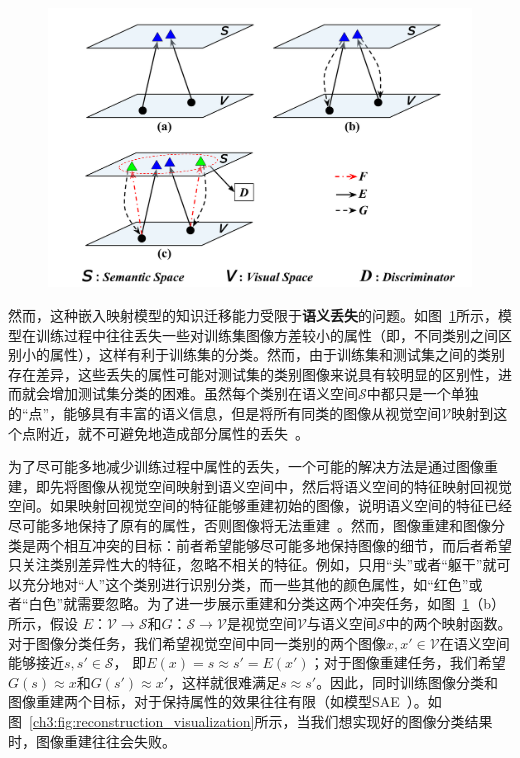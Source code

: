 \begin{figure}
    \centering
        \includegraphics[width=0.98\linewidth]{chapter3/res/zsl_paradigms.pdf}
    \label{ch3:fig:zsl_paradigms}
\end{figure}

然而，这种嵌入映射模型的知识迁移能力受限于\textbf{语义丢失}的问题。如图~\ref{ch3:fig:zsl_paradigms}所示，模型在训练过程中往往丢失一些对训练集图像方差较小的属性（即，不同类别之间区别小的属性），这样有利于训练集的分类。然而，由于训练集和测试集之间的类别存在差异，这些丢失的属性可能对测试集的类别图像来说具有较明显的区别性，进而就会增加测试集分类的困难。虽然每个类别在语义空间$\mathcal{S}$中都只是一个单独的“点”，能够具有丰富的语义信息，但是将所有同类的图像从视觉空间$\mathcal{V}$映射到这个点附近，就不可避免地造成部分属性的丢失~\cite{lazaridou2015hubness,fu2015transductive}。


为了尽可能多地减少训练过程中属性的丢失，一个可能的解决方法是通过图像重建，即先将图像从视觉空间映射到语义空间中，然后将语义空间的特征映射回视觉空间。如果映射回视觉空间的特征能够重建初始的图像，说明语义空间的特征已经尽可能多地保持了原有的属性，否则图像将无法重建~\cite{kim2017learning,yi2017dualgan,zhu2017unpaired,he2016dual}。然而，图像重建和图像分类是两个相互冲突的目标：前者希望能够尽可能多地保持图像的细节，而后者希望只关注类别差异性大的特征，忽略不相关的特征。例如，只用“头”或者“躯干”就可以充分地对“人”这个类别进行识别分类，而一些其他的颜色属性，如“红色”或者“白色”就需要忽略。为了进一步展示重建和分类这两个冲突任务，如图~\ref{ch3:fig:zsl_paradigms}（b）所示，假设 $E$：$\mathcal{V}\rightarrow \mathcal{S}$和$G$：$\mathcal{S}\rightarrow \mathcal{V}$是视觉空间$\mathcal{V}$与语义空间$\mathcal{S}$中的两个映射函数。对于图像分类任务，我们希望视觉空间中同一类别的两个图像$x, x'\in \mathcal{V}$在语义空间能够接近$s, s'\in\mathcal{S}$， 即$E(x) = s \approx s' = E(x')$；对于图像重建任务，我们希望$G(s)\approx x$和$G(s')\approx x'$，这样就很难满足$s\approx s'$。因此，同时训练图像分类和图像重建两个目标，对于保持属性的效果往往有限（如模型SAE~\cite{kodirov2017semantic}）。如图~\ref{ch3:fig:reconstruction_visualization}所示，当我们想实现好的图像分类结果时，图像重建往往会失败。

